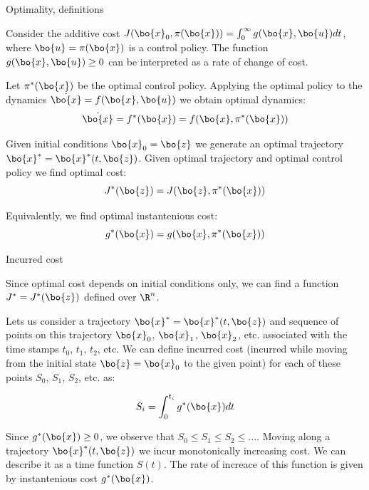 \documentclass{beamer}
\begin{document}
\begin{frame}{Optimality, definitions}
	\begin{flushleft}
		
		Consider the additive cost $J (\bo{x}_0, \pi (\bo{x})) = \int_0^\infty g(\bo{x}, \bo{u}) dt$, where $\bo{u} = \pi (\bo{x})$ is a control policy. The function $g(\bo{x}, \bo{u}) \geq 0$ can be interpreted as a rate of change of cost.
		
		\bigskip
		
		Let $\pi^*(\bo{x})$ be the optimal control policy. Applying the optimal policy to the dynamics $\dot{\bo{x}} = f(\bo{x}, \bo{u})$ we obtain optimal dynamics:
		\begin{equation}
			\dot{\bo{x}} = f^*(\bo{x}) = f(\bo{x}, \pi^*(\bo{x}))
		\end{equation}
		
		Given initial conditions $\bo{x}_0 = \bo{z}$ we generate an optimal trajectory $\bo{x}^* = \bo{x}^*(t, \bo{z})$. Given optimal trajectory and optimal control policy we find optimal cost:
		\begin{equation}
			J^*(\bo{z}) = J(\bo{z}, \pi^* (\bo{x}))
		\end{equation}
		
		Equivalently, we find optimal instantenious cost:
		\begin{equation}
			g^*(\bo{x}) = g(\bo{x}, \pi^* (\bo{x}))
		\end{equation}
		
		
	\end{flushleft}
\end{frame}



\begin{frame}{Incurred cost}
	\begin{flushleft}
		
		Since optimal cost depends on initial conditions only, we can find a function $J^* = J^*(\bo{z})$ defined over $\R^n$.
		
		\bigskip
		
		Lets us consider a trajectory $\bo{x}^* = \bo{x}^*(t, \bo{z})$ and sequence of points on this trajectory $\bo{x}_0$, $\bo{x}_1$, $\bo{x}_2$, etc. associated with the time stamps $t_0$, $t_1$, $t_2$, etc. We can define incurred cost (incurred while moving from the initial state $\bo{z} = \bo{x}_0$ to the given point) for each of these points $S_0$, $S_1$, $S_2$, etc. as:
		
		\begin{equation}
			S_i = \int_0^{t_i} g^*(\bo{x}) dt
		\end{equation}
		
		Since $g^*(\bo{x}) \geq 0$, we observe that $S_0 \leq S_1 \leq S_2 \leq ...$. Moving along a trajectory $\bo{x}^*(t, \bo{z})$ we incur monotonically increasing cost. We can describe it as a time function $S(t)$. The rate of increace of this function is given by instantenious cost $g^*(\bo{x})$.
		
		
	\end{flushleft}
\end{frame}
\end{document}
